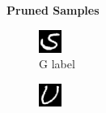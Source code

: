 \documentclass[conference]{IEEEtran}
\begin{document}
\begin{figure}[h]
    \centering
    \textbf{Pruned Samples}\par\medskip 
    \begin{subfigure}{.20\columnwidth}
        \centering
        \includegraphics[width=.90\textwidth]{./images/issues/excluded-G-0-inferred-S.png}
        \caption{G label}
        \label{fig:inf_issue_G0}
    \end{subfigure}%
    \begin{subfigure}{.20\columnwidth}
        \centering
        \includegraphics[width=.90\textwidth]{./images/issues/excluded-T-5-inferred-u.png}

\end{subfigure}
\end{figure}
\end{document}
